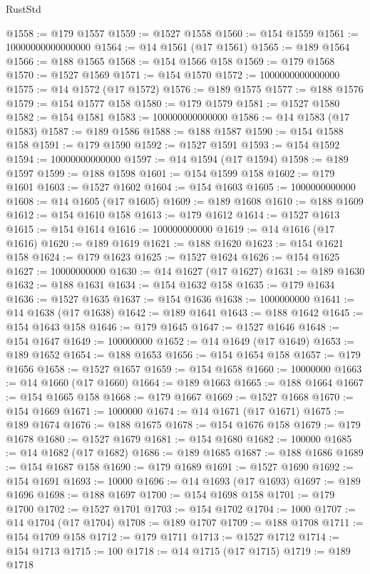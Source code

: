 \begin{lexlean}{RustStd}
\begin{coremodule}
@1558 := @179 @1557
@1559 := @1527 @1558
@1560 := @154 @1559
@1561 := 10000000000000000
@1564 := @14 @1561 (@17 @1561)
@1565 := @189 @1564
@1566 := @188 @1565
@1568 := @154 @1566 @158
@1569 := @179 @1568
@1570 := @1527 @1569
@1571 := @154 @1570
@1572 := 1000000000000000
@1575 := @14 @1572 (@17 @1572)
@1576 := @189 @1575
@1577 := @188 @1576
@1579 := @154 @1577 @158
@1580 := @179 @1579
@1581 := @1527 @1580
@1582 := @154 @1581
@1583 := 100000000000000
@1586 := @14 @1583 (@17 @1583)
@1587 := @189 @1586
@1588 := @188 @1587
@1590 := @154 @1588 @158
@1591 := @179 @1590
@1592 := @1527 @1591
@1593 := @154 @1592
@1594 := 10000000000000
@1597 := @14 @1594 (@17 @1594)
@1598 := @189 @1597
@1599 := @188 @1598
@1601 := @154 @1599 @158
@1602 := @179 @1601
@1603 := @1527 @1602
@1604 := @154 @1603
@1605 := 1000000000000
@1608 := @14 @1605 (@17 @1605)
@1609 := @189 @1608
@1610 := @188 @1609
@1612 := @154 @1610 @158
@1613 := @179 @1612
@1614 := @1527 @1613
@1615 := @154 @1614
@1616 := 100000000000
@1619 := @14 @1616 (@17 @1616)
@1620 := @189 @1619
@1621 := @188 @1620
@1623 := @154 @1621 @158
@1624 := @179 @1623
@1625 := @1527 @1624
@1626 := @154 @1625
@1627 := 10000000000
@1630 := @14 @1627 (@17 @1627)
@1631 := @189 @1630
@1632 := @188 @1631
@1634 := @154 @1632 @158
@1635 := @179 @1634
@1636 := @1527 @1635
@1637 := @154 @1636
@1638 := 1000000000
@1641 := @14 @1638 (@17 @1638)
@1642 := @189 @1641
@1643 := @188 @1642
@1645 := @154 @1643 @158
@1646 := @179 @1645
@1647 := @1527 @1646
@1648 := @154 @1647
@1649 := 100000000
@1652 := @14 @1649 (@17 @1649)
@1653 := @189 @1652
@1654 := @188 @1653
@1656 := @154 @1654 @158
@1657 := @179 @1656
@1658 := @1527 @1657
@1659 := @154 @1658
@1660 := 10000000
@1663 := @14 @1660 (@17 @1660)
@1664 := @189 @1663
@1665 := @188 @1664
@1667 := @154 @1665 @158
@1668 := @179 @1667
@1669 := @1527 @1668
@1670 := @154 @1669
@1671 := 1000000
@1674 := @14 @1671 (@17 @1671)
@1675 := @189 @1674
@1676 := @188 @1675
@1678 := @154 @1676 @158
@1679 := @179 @1678
@1680 := @1527 @1679
@1681 := @154 @1680
@1682 := 100000
@1685 := @14 @1682 (@17 @1682)
@1686 := @189 @1685
@1687 := @188 @1686
@1689 := @154 @1687 @158
@1690 := @179 @1689
@1691 := @1527 @1690
@1692 := @154 @1691
@1693 := 10000
@1696 := @14 @1693 (@17 @1693)
@1697 := @189 @1696
@1698 := @188 @1697
@1700 := @154 @1698 @158
@1701 := @179 @1700
@1702 := @1527 @1701
@1703 := @154 @1702
@1704 := 1000
@1707 := @14 @1704 (@17 @1704)
@1708 := @189 @1707
@1709 := @188 @1708
@1711 := @154 @1709 @158
@1712 := @179 @1711
@1713 := @1527 @1712
@1714 := @154 @1713
@1715 := 100
@1718 := @14 @1715 (@17 @1715)
@1719 := @189 @1718

\end{coremodule}
\end{lexlean}
